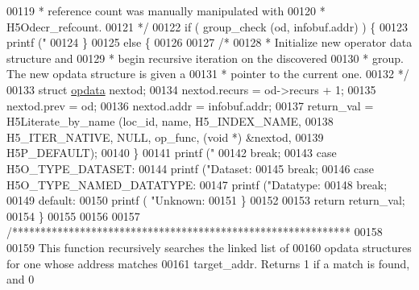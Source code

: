 \begin{DoxyCode}
{{00119 \textcolor{comment}{             * reference count was manually manipulated with}
00120 \textcolor{comment}{             * H5Odecr\_refcount.}
00121 \textcolor{comment}{             */}
00122             \textcolor{keywordflow}{if} ( group\_check (od, infobuf.addr) ) \{
00123                 printf (\textcolor{stringliteral}{"%
00124             \}
00125             \textcolor{keywordflow}{else} \{
00126 
00127                 \textcolor{comment}{/*}
00128 \textcolor{comment}{                 * Initialize new operator data structure and}
00129 \textcolor{comment}{                 * begin recursive iteration on the discovered}
00130 \textcolor{comment}{                 * group.  The new opdata structure is given a}
00131 \textcolor{comment}{                 * pointer to the current one.}
00132 \textcolor{comment}{                 */}
00133                 \textcolor{keyword}{struct }\hyperlink{structopdata}{opdata} nextod;
00134                 nextod.recurs = od->recurs + 1;
00135                 nextod.prev = od;
00136                 nextod.addr = infobuf.addr;
00137                 return\_val = H5Literate\_by\_name (loc\_id, name, H5\_INDEX\_NAME,
00138                             H5\_ITER\_NATIVE, NULL, op\_func, (\textcolor{keywordtype}{void} *) &nextod,
00139                             H5P\_DEFAULT);
00140             \}
00141             printf (\textcolor{stringliteral}{"%
00142             \textcolor{keywordflow}{break};
00143         \textcolor{keywordflow}{case} H5O\_TYPE\_DATASET:
00144             printf (\textcolor{stringliteral}{"Dataset: %
00145             \textcolor{keywordflow}{break};
00146         \textcolor{keywordflow}{case} H5O\_TYPE\_NAMED\_DATATYPE:
00147             printf (\textcolor{stringliteral}{"Datatype: %
00148             \textcolor{keywordflow}{break};
00149         \textcolor{keywordflow}{default}:
00150             printf ( \textcolor{stringliteral}{"Unknown: %
00151     \}
00152 
00153     \textcolor{keywordflow}{return} return\_val;
00154 \}
00155 
00156 
00157 \textcolor{comment}{/************************************************************}
00158 \textcolor{comment}{}
00159 \textcolor{comment}{  This function recursively searches the linked list of}
00160 \textcolor{comment}{  opdata structures for one whose address matches}
00161 \textcolor{comment}{  target\_addr.  Returns 1 if a match is found, and 0}
}}}}}}}
\end{DoxyCode}
